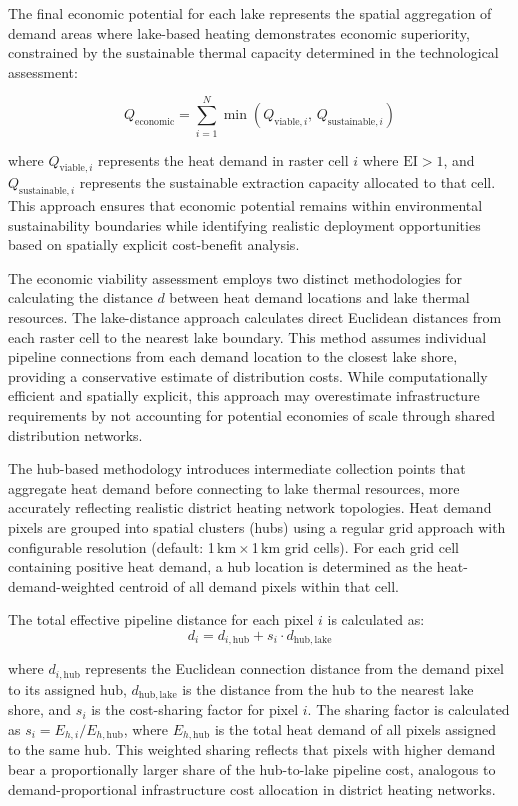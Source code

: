 The final economic potential for each lake represents the spatial aggregation of demand areas where lake-based heating demonstrates economic superiority, constrained by the sustainable thermal capacity determined in the technological assessment:

\begin{equation}
Q_{\text{economic}} = \sum_{i=1}^{N} \min\left(Q_{\text{viable}, i},\, Q_{\text{sustainable}, i}\right)
\end{equation}

\noindent where $Q_{\text{viable}, i}$ represents the heat demand in raster cell $i$ where $\mathrm{EI} > 1$, and $Q_{\text{sustainable}, i}$ represents the sustainable extraction capacity allocated to that cell. This approach ensures that economic potential remains within environmental sustainability boundaries while identifying realistic deployment opportunities based on spatially explicit cost-benefit analysis.

The economic viability assessment employs two distinct methodologies for calculating the distance $d$ between heat demand locations and lake thermal resources. The lake-distance approach calculates direct Euclidean distances from each raster cell to the nearest lake boundary. This method assumes individual pipeline connections from each demand location to the closest lake shore, providing a conservative estimate of distribution costs. While computationally efficient and spatially explicit, this approach may overestimate infrastructure requirements by not accounting for potential economies of scale through shared distribution networks.

The hub-based methodology introduces intermediate collection points that aggregate heat demand before connecting to lake thermal resources, more accurately reflecting realistic district heating network topologies. Heat demand pixels are grouped into spatial clusters (hubs) using a regular grid approach with configurable resolution (default: 1\,km\,$\times$\,1\,km grid cells). For each grid cell containing positive heat demand, a hub location is determined as the heat-demand-weighted centroid of all demand pixels within that cell.

The total effective pipeline distance for each pixel $i$ is calculated as:
\begin{equation}
d_{i} = d_{i,\mathrm{hub}} + s_i \cdot d_{\mathrm{hub,lake}}
\end{equation}

\noindent where $d_{i,\mathrm{hub}}$ represents the Euclidean connection distance from the demand pixel to its assigned hub, $d_{\mathrm{hub,lake}}$ is the distance from the hub to the nearest lake shore, and $s_i$ is the cost-sharing factor for pixel $i$. The sharing factor is calculated as $s_i = E_{h,i} / E_{h,\mathrm{hub}}$, where $E_{h,\mathrm{hub}}$ is the total heat demand of all pixels assigned to the same hub. This weighted sharing reflects that pixels with higher demand bear a proportionally larger share of the hub-to-lake pipeline cost, analogous to demand-proportional infrastructure cost allocation in district heating networks.